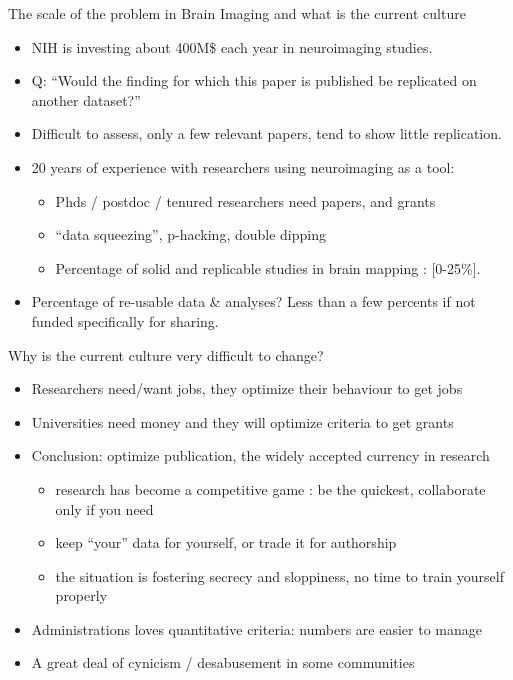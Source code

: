 \documentclass[ignorenonframetext,]{beamer}
\begin{document}
\begin{frame}{The scale of the problem in Brain Imaging and what is the
current culture}

\begin{itemize}[<+->]
\itemsep1pt\parskip0pt
\item
  NIH is investing about 400M\$ each year in neuroimaging studies.
\item
  Q: ``Would the finding for which this paper is published be replicated
  on another dataset?''
\item
  Difficult to assess, only a few relevant papers, tend to show little
  replication.
\item
  20 years of experience with researchers using neuroimaging as a tool:

  \begin{itemize}[<+->]
  \itemsep1pt\parskip0pt
  \item
    Phds / postdoc / tenured researchers need papers, and grants
  \item
    ``data squeezing'', p-hacking, double dipping
  \item
    Percentage of solid and replicable studies in brain mapping :
    {[}0-25\%{]}.
  \end{itemize}
\item
  Percentage of re-usable data \& analyses? Less than a few percents if
  not funded specifically for sharing.
\end{itemize}

\end{frame}

\begin{frame}{Why is the current culture very difficult to change?}

\begin{itemize}[<+->]
\itemsep1pt\parskip0pt
\item
  Researchers need/want jobs, they optimize their behaviour to get jobs
\item
  Universities need money and they will optimize criteria to get grants
\item
  Conclusion: optimize publication, the widely accepted currency in
  research

  \begin{itemize}[<+->]
  \itemsep1pt\parskip0pt
  \item
    research has become a competitive game : be the quickest,
    collaborate only if you need
  \item
    keep ``your'' data for yourself, or trade it for authorship
  \item
    the situation is fostering secrecy and sloppiness, no time to train
    yourself properly
  \end{itemize}
\item
  Administrations loves quantitative criteria: numbers are easier to
  manage
\item
  A great deal of cynicism / desabusement in some communities
\end{itemize}

\end{frame}
\end{document}
